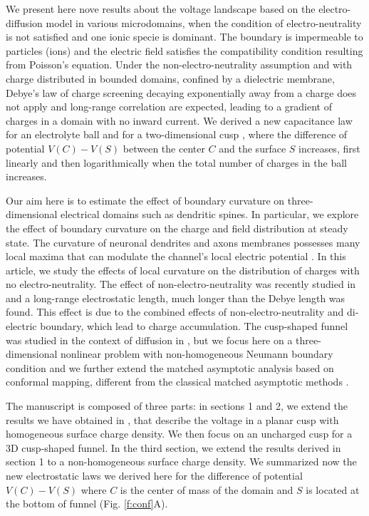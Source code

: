 \documentclass[12pt]{article}
\begin{document}
We present here nove results about the voltage landscape based on the electro-diffusion model in various microdomains, when the condition of electro-neutrality is not satisfied and one ionic specie is dominant. The boundary is impermeable to particles (ions) and the electric field satisfies the compatibility condition resulting from Poisson's equation. Under the non-electro-neutrality assumption and with charge distributed in bounded domains, confined by a dielectric membrane, Debye's law of charge screening decaying exponentially away from a charge \cite{Debye} does not apply and long-range correlation are expected, leading to a gradient of charges in a domain with no inward current. We derived a new capacitance law for an electrolyte ball \cite{PhysD2016} and for a two-dimensional cusp \cite{NonLin2017}, where the difference of potential $V(C)-V(S)$ between the center $C$ and the surface $S$ increases, first linearly and then logarithmically when the total number of charges in the ball increases.

Our aim here is to estimate the effect of boundary curvature on three-dimensional electrical domains such as dendritic spines. In particular, we explore the effect of boundary curvature on the charge and field distribution at steady state. The curvature of neuronal dendrites and axons membranes possesses many local maxima that can modulate the channel's local electric potential \cite{Bezanilla,YusteBook,BioRXiv}. In this article, we study the effects of local curvature on the distribution of charges with no electro-neutrality. The effect of non-electro-neutrality was recently studied in \cite{PhysD2016,NonLin2017} and a long-range electrostatic length, much longer than the Debye length was found. This effect is due to the combined effects of non-electro-neutrality and di-electric boundary, which lead to charge accumulation. The cusp-shaped funnel was studied in the context of diffusion in \cite{HS2012}, but we focus here on a three-dimensional nonlinear problem with non-homogeneous Neumann boundary condition and we further extend the matched asymptotic analysis based on conformal mapping, different from the classical matched asymptotic methods \cite{Ward0,Ward4,Ward2,Ward3,Ward1}.

The manuscript is composed of three parts: in sections 1 and 2, we extend the results we have obtained in \cite{NonLin2017}, that describe the voltage in a planar cusp with homogeneous surface charge density. We then focus on an uncharged cusp for a 3D cusp-shaped funnel. In the third section, we extend the results derived in section 1 to a non-homogeneous surface charge density. We summarized now the new electrostatic laws we derived here for the difference of potential $V(C)-V(S)$ where $C$ is the center of mass of the domain and $S$ is located at the bottom of funnel (Fig. \ref{f:conf}A).
\end{document}
